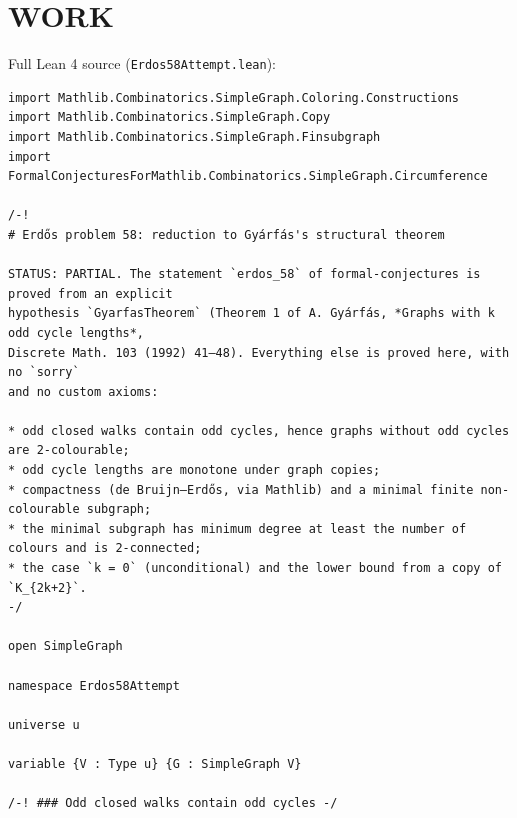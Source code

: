 \section{WORK}
Full Lean 4 source (\texttt{Erdos58Attempt.lean}):
\begin{verbatim}
import Mathlib.Combinatorics.SimpleGraph.Coloring.Constructions
import Mathlib.Combinatorics.SimpleGraph.Copy
import Mathlib.Combinatorics.SimpleGraph.Finsubgraph
import FormalConjecturesForMathlib.Combinatorics.SimpleGraph.Circumference

/-!
# Erdős problem 58: reduction to Gyárfás's structural theorem

STATUS: PARTIAL. The statement `erdos_58` of formal-conjectures is proved from an explicit
hypothesis `GyarfasTheorem` (Theorem 1 of A. Gyárfás, *Graphs with k odd cycle lengths*,
Discrete Math. 103 (1992) 41–48). Everything else is proved here, with no `sorry`
and no custom axioms:

* odd closed walks contain odd cycles, hence graphs without odd cycles are 2-colourable;
* odd cycle lengths are monotone under graph copies;
* compactness (de Bruijn–Erdős, via Mathlib) and a minimal finite non-colourable subgraph;
* the minimal subgraph has minimum degree at least the number of colours and is 2-connected;
* the case `k = 0` (unconditional) and the lower bound from a copy of `K_{2k+2}`.
-/

open SimpleGraph

namespace Erdos58Attempt

universe u

variable {V : Type u} {G : SimpleGraph V}

/-! ### Odd closed walks contain odd cycles -/


\end{verbatim}
